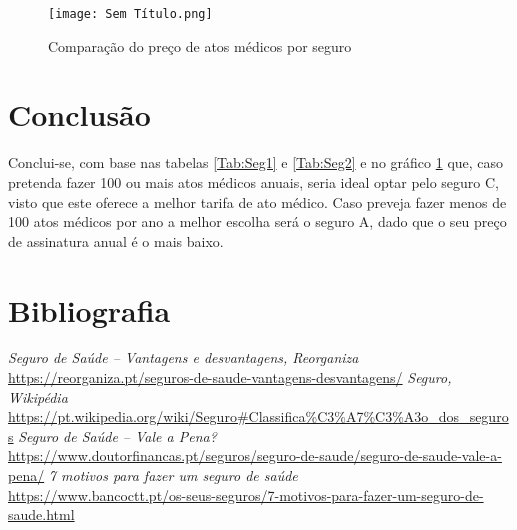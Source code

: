\documentclass[11pt, a4paper]{article}
\begin{document}
\begin{figure} [h]
\centering
\texttt{[image: Sem Título.png]}
\caption{Comparação do preço de atos médicos por seguro}
\label{Fig:1}
\end{figure}


\clearpage
\section{Conclus\~ao}
Conclui-se, com base nas tabelas \ref{Tab:Seg1} e \ref{Tab:Seg2} e no gráfico \ref{Fig:1} que, caso pretenda fazer 100 ou  mais atos médicos anuais, seria ideal optar pelo seguro C, visto que este oferece a melhor tarifa de ato médico. Caso  preveja fazer menos de 100 atos médicos por ano a melhor escolha será o seguro A, dado que o seu preço de assinatura anual é o mais baixo.

\clearpage
\section{Bibliografia}
\begin{thebibliography}{9}
 \textit{Seguro de Saúde – Vantagens e desvantagens, Reorganiza}\\ \url{https://reorganiza.pt/seguros-de-saude-vantagens-desvantagens/}
 \textit{Seguro, Wikipédia}\\
\url{https://pt.wikipedia.org/wiki/Seguro#Classifica%C3%A7%C3%A3o_dos_seguros}
 \textit{Seguro de Saúde – Vale a Pena?}\\ \url{https://www.doutorfinancas.pt/seguros/seguro-de-saude/seguro-de-saude-vale-a-pena/}
 \textit{7 motivos para fazer um seguro de saúde}\\ \url{https://www.bancoctt.pt/os-seus-seguros/7-motivos-para-fazer-um-seguro-de-saude.html}
\end{thebibliography}
\end{document}
